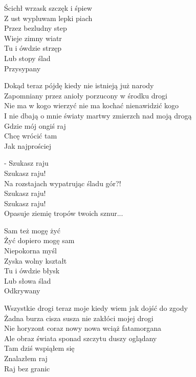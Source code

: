 \begin{text}
    Ścichł wrzask szczęk i śpiew\\
    Z ust wypluwam lepki piach\\
    Przez bezludny step\\
    Wieje zimny wiatr\\
    Tu i ówdzie strzęp\\
    Lub stopy ślad\\
    Przysypany

    Dokąd teraz pójdę kiedy nie istnieją już narody\\
    Zapomniany przez anioły porzucony w środku drogi\\
    Nie ma w kogo wierzyć nie ma kochać nienawidzić kogo\\
    I nie dbają o mnie światy martwy zmierzch nad moją drogą\\
    Gdzie mój ongiś raj\\
    Chcę wrócić tam\\
    Jak najprościej

    - Szukasz raju\\
    Szukasz raju!\\
    Na rozstajach wypatrując śladu gór?!\\
    Szukasz raju!\\
    Szukasz raju!\\
    Opasuje ziemię tropów twoich sznur...

    Sam też mogę żyć\\
    Żyć dopiero mogę sam\\
    Niepokorna myśl\\
    Zyska wolny kształt\\
    Tu i ówdzie błysk\\
    Lub słowa ślad\\
    Odkrywany

    Wszystkie drogi teraz moje kiedy wiem jak dojść do zgody\\
    Żadna burza cisza susza nie zakłóci mojej drogi\\
    Nie horyzont coraz nowy nowa wciąż fatamorgana\\
    Ale obraz świata sponad szczytu duszy oglądany\\
    Tam dziś wspiąłem się\\
    Znalazłem raj\\
    Raj bez granic


\end{text}
